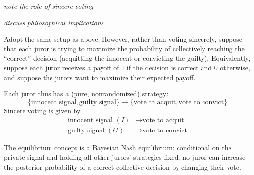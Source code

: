 \documentclass[../../../main.tex]{subfiles}
\begin{document}
\begin{remark}
    \textit{note the role of sincere voting}
\end{remark}

\textit{discuss philosophical implications}

\begin{definition}
    Adopt the same setup as above. 
    However, rather than voting sincerely, suppose that each juror is trying to maximize the probability of collectively reaching the ``correct'' decision (acquitting the innocent or convicting the guilty).
    Equivalently, suppose each juror receives a payoff of 1 if the decision is correct and 0 otherwise, and suppose the jurors want to maximize their expected payoff.

    Each juror thus has a (pure, nonrandomized) strategy:
    \begin{equation*}
        \{\textrm{innocent signal}, \textrm{guilty signal}\}\rightarrow \{\textrm{vote to acquit}, \textrm{vote to convict}\}
    \end{equation*}
    Sincere voting is given by
    \begin{align*}
        \textrm{innocent signal }(I)&\mapsto\textrm{vote to acquit}\\
        \textrm{guilty signal }(G)&\mapsto\textrm{vote to convict}
    \end{align*}

    The equilibrium concept is a Bayesian Nash equilibrium: conditional on the private signal and holding all other jurors' strategies fixed, no juror can increase the posterior probability of a correct collective decision by changing their vote.
\end{definition}
\end{document}
